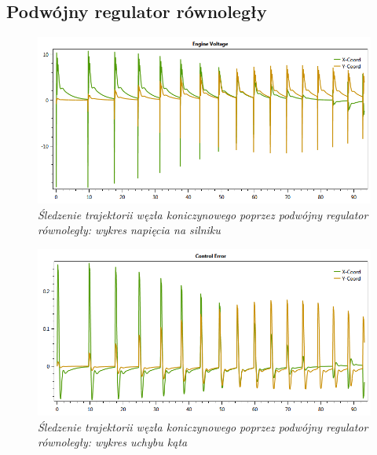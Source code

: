 \documentclass[12pt, oneside]{report}
\theoremstyle{definition}
\begin{document}
\begin{appendices}
\section{Podwójny regulator równoległy}
\begin{figure}[H]
	\centering
		\includegraphics[width = 400pt]{TrefoilKnotParallelEV} 
		\caption{\textit{Śledzenie trajektorii węzła koniczynowego poprzez podwójny regulator równoległy: wykres napięcia na silniku}}
		\label{plot:TrefoilKnotParallelEV}
\end{figure}

\begin{figure}[H]
	\centering
		\includegraphics[width = 400pt]{TrefoilKnotParallelCE} 
		\caption{\textit{Śledzenie trajektorii węzła koniczynowego poprzez podwójny regulator równoległy: wykres uchybu kąta}}
		\label{plot:TrefoilKnotParallelCE}
\end{figure}


\end{appendices}
\end{document}
